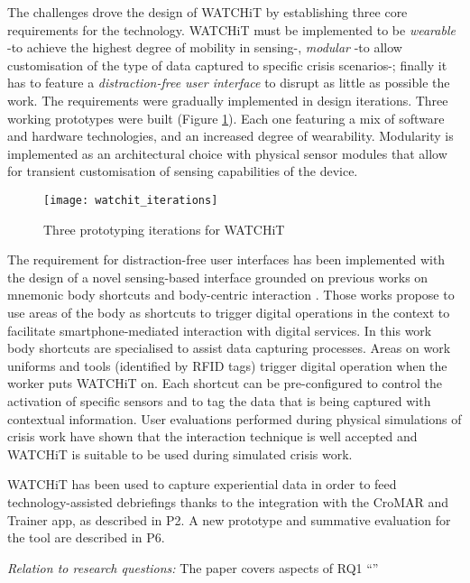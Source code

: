The challenges drove the design of WATCHiT by establishing three core requirements for the technology. WATCHiT must be implemented to be \emph{wearable} -to achieve the highest degree of mobility in sensing-, \emph{modular} -to allow customisation of the type of data captured to specific crisis scenarios-; finally it has to feature a \emph{distraction-free user interface} to disrupt as little as possible the work. The requirements were gradually implemented in design iterations. Three working prototypes were built (Figure \ref{fig:watchit-prototypes}). Each one featuring a mix of software and hardware technologies, and an increased degree of wearability. Modularity is implemented as an architectural choice with physical sensor modules that allow for transient customisation of sensing capabilities of the device.

\begin{figure}
	[tbh] \centering 
	\texttt{[image: watchit\_iterations]} \caption{Three prototyping iterations for WATCHiT} \label{fig:watchit-prototypes} 
\end{figure}

The requirement for distraction-free user interfaces has been implemented with the design of a novel sensing-based interface grounded on previous works on mnemonic body shortcuts and body-centric interaction \autocites{Guerreiro:2008wt}{Chen:2012wk}. Those works propose to use areas of the body as shortcuts to trigger digital operations in the context to facilitate smartphone-mediated interaction with digital services. In this work body shortcuts are specialised to assist data capturing processes. Areas on work uniforms and tools (identified by RFID tags) trigger digital operation when the worker puts WATCHiT on. Each shortcut can be pre-configured to control the activation of specific sensors and to tag the data that is being captured with contextual information. User evaluations performed during physical simulations of crisis work have shown that the interaction technique is well accepted and WATCHiT is suitable to be used during simulated crisis work.

WATCHiT has been used to capture experiential data in order to feed technology-assisted debriefings thanks to the integration with the CroMAR and Trainer app, as described in P2. A new prototype and summative evaluation for the tool are described in P6.

\emph{Relation to research questions:} The paper covers aspects of RQ1 ``\RQi''

